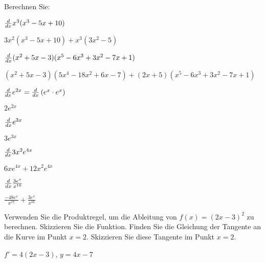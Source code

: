 \begin{exercises}

\noindent Berechnen Sie:

\twocol

\begin{exercise} $\frac{d}{dx} x^3(x^3-5x+10)$
\begin{answer} $3x^2(x^3-5x+10)+x^3(3x^2-5)$
\end{answer}\end{exercise}

\begin{exercise} $\frac{d}{dx} (x^2+5x-3)(x^5-6x^3+3x^2-7x+1)$
\begin{answer} $(x^2+5x-3)(5x^4-18x^2+6x-7)+(2x+5)(x^5-6x^3+3x^2-7x+1)$
\end{answer}\end{exercise}

\begin{exercise} $\frac{d}{dx} e^{2x} = \frac{d}{dx} \left(e^x \cdot e^x\right)$
\begin{answer}
$2e^{2x}$
\end{answer}
\end{exercise}

\begin{exercise} $\frac{d}{dx} e^{3x}$
\begin{answer} $3e^{3x}$
\end{answer}\end{exercise}


\begin{exercise} $\frac{d}{dx} 3x^2e^{4x}$
\begin{answer} $6xe^{4x}+12x^2e^{4x}$
\end{answer}\end{exercise}


\begin{exercise} $\frac{d}{dx} \frac{3e^x}{x^{16}}$
\begin{answer} $\frac{-48e^x}{x^{17}}+\frac{3e^x}{x^{16}}$
\end{answer}\end{exercise}


\endtwocol


\begin{exercise} 
Verwenden Sie die Produktregel, um die Ableitung von $f(x)=(2x-3)^2$ zu berechnen. Skizzieren Sie die Funktion. Finden Sie die Gleichung der Tangente an die Kurve im Punkt $x=2$.  Skizzieren Sie diese Tangente im Punkt $x=2$.
\begin{answer} $f'=4(2x-3)$, $y=4x-7$
\end{answer}\end{exercise}


\end{exercises}
